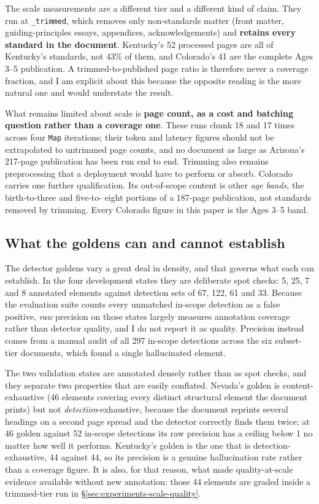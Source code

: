 The scale measurements are a different tier and a different kind of claim. They
run at \texttt{\_trimmed}, which removes only non-standards matter (front
matter, guiding-principles essays, appendices, acknowledgements) and
\textbf{retains every standard in the document}. Kentucky's 52 processed pages
are all of Kentucky's standards, not 43\% of them, and Colorado's 41 are the
complete Ages 3--5 publication. A trimmed-to-published page ratio is therefore
never a coverage fraction, and I am explicit about this because the opposite
reading is the more natural one and would understate the result.

What remains limited about scale is \textbf{page count, as a cost and batching
question rather than a coverage one}. These runs chunk 18 and 17 times across
four \texttt{Map} iterations; their token and latency figures should not be
extrapolated to untrimmed page counts, and no document as large as Arizona's
217-page publication has been run end to end. Trimming also remains
preprocessing that a deployment would have to perform or absorb. Colorado carries one further qualification. Its
out-of-scope content is other \emph{age bands}, the birth-to-three and five-to-
eight portions of a 187-page publication, not standards removed by trimming. Every
Colorado figure in this paper is the Ages 3--5 band.

\subsection{What the goldens can and cannot establish}
\label{sec:discussion-goldens}

The detector goldens vary a great deal in density, and that governs what each
can establish. In the four development states they are deliberate spot checks:
5, 25, 7 and 8 annotated elements against detection sets of 67, 122, 61 and
33. Because the evaluation suite counts every unmatched in-scope detection as a
false positive, \emph{raw} precision on those states largely measures annotation
coverage rather than detector quality, and I do not report it as quality.
Precision instead comes from a manual audit of all 297 in-scope detections
across the six subset-tier documents, which found a single hallucinated
element.

The two validation states are annotated densely rather than as spot checks, and
they separate two properties that are easily conflated. Nevada's golden is
content-exhaustive (46 elements covering every distinct structural element
the document prints) but not \emph{detection}-exhaustive, because the
document reprints several headings on a second page spread and the detector
correctly finds them twice; at 46 golden against 52 in-scope detections its raw
precision has a ceiling below 1 no matter how well it performs. Kentucky's
golden is the one that is detection-exhaustive, 44 against 44, so its precision
is a genuine hallucination rate rather than a coverage figure. It is also, for
that reason, what made quality-at-scale evidence available without new
annotation: those 44 elements are graded inside a trimmed-tier run in
\S\ref{sec:experiments-scale-quality}.

